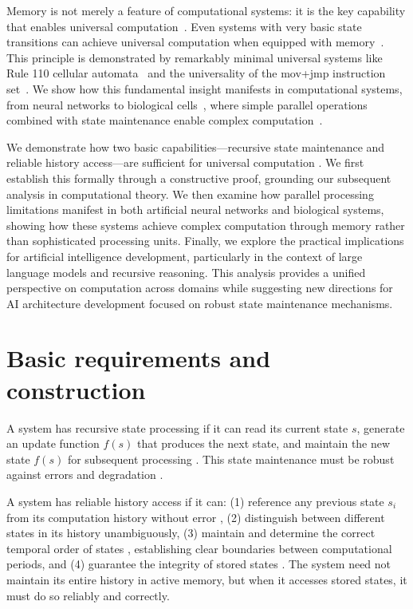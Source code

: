 \documentclass[12pt]{article}
\begin{document}
Memory is not merely a feature of computational systems: it is the key capability that enables universal computation~\cite{turing1936computable}.
Even systems with very basic state transitions can achieve universal computation when equipped with memory~\cite{merrill2023parallelism,peng2024limitations}.
This principle is demonstrated by remarkably minimal universal systems like Rule 110 cellular automata~\cite{cook2004universality} and the universality of the mov+jmp instruction set~\cite{savage1994space}.
We show how this fundamental insight manifests in computational systems, from neural networks to biological cells~\cite{wang2023parallel}, where simple parallel operations combined with state maintenance enable complex computation~\cite{swamy1983space,bisaz2024memory}.

We demonstrate how two basic capabilities---recursive state maintenance and reliable history access---are sufficient for universal computation \cite{bennett1989time,boyle2024memory}.
We first establish this formally through a constructive proof, grounding our subsequent analysis in computational theory.
We then examine how parallel processing limitations manifest in both artificial neural networks and biological systems, showing how these systems achieve complex computation through memory rather than sophisticated processing units.
Finally, we explore the practical implications for artificial intelligence development, particularly in the context of large language models and recursive reasoning.
This analysis provides a unified perspective on computation across domains while suggesting new directions for AI architecture development focused on robust state maintenance mechanisms.

\section{Basic requirements and construction}

A system has recursive state processing if it can read its current state $s$, generate an update function $f(s)$ that produces the next state, and maintain the new state $f(s)$ for subsequent processing \cite{manuri2019state}.
This state maintenance must be robust against errors and degradation \cite{yang2013survey}.

A system has reliable history access if it can: (1) reference any previous state $s_i$ from its computation history without error \cite{fu2024memory}, (2) distinguish between different states in its history unambiguously, (3) maintain and determine the correct temporal order of states \cite{berridge2014cell,pastor2020computation}, establishing clear boundaries between computational periods, and (4) guarantee the integrity of stored states \cite{lovkvist2021using}.
The system need not maintain its entire history in active memory, but when it accesses stored states, it must do so reliably and correctly.
\end{document}

